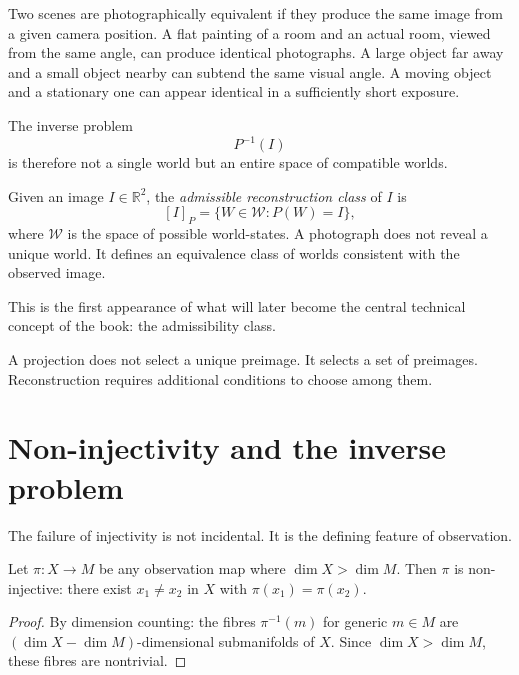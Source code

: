 \begin{example}
  Two scenes are photographically equivalent if they produce the
  same image from a given camera position.
  A flat painting of a room and an actual room, viewed from the
  same angle, can produce identical photographs.
  A large object far away and a small object nearby can subtend
  the same visual angle.
  A moving object and a stationary one can appear identical in a
  sufficiently short exposure.
\end{example}

The inverse problem
\[
  P^{-1}(I)
\]
is therefore not a single world but an entire space of compatible
worlds.

\begin{definition}
  Given an image $I \in \mathbb{R}^2$, the
  \emph{admissible reconstruction class} of $I$ is
  \[
    [I]_P = \{W \in \mathcal{W} : P(W) = I\},
  \]
  where $\mathcal{W}$ is the space of possible world-states.
  A photograph does not reveal a unique world.
  It defines an equivalence class of worlds consistent with the
  observed image.
\end{definition}

This is the first appearance of what will later become the central
technical concept of the book: the admissibility class.

A projection does not select a unique preimage.
It selects a set of preimages.
Reconstruction requires additional conditions to choose among them.

\section{Non-injectivity and the inverse problem}

The failure of injectivity is not incidental.
It is the defining feature of observation.

\begin{proposition}
  Let $\pi : X \to M$ be any observation map where $\dim X >
  \dim M$.
  Then $\pi$ is non-injective: there exist $x_1 \neq x_2$ in $X$
  with $\pi(x_1) = \pi(x_2)$.
\end{proposition}

\begin{proof}
  By dimension counting: the fibres $\pi^{-1}(m)$ for generic
  $m \in M$ are $({\dim X - \dim M})$-dimensional submanifolds of
  $X$.
  Since $\dim X > \dim M$, these fibres are nontrivial.
\end{proof}

